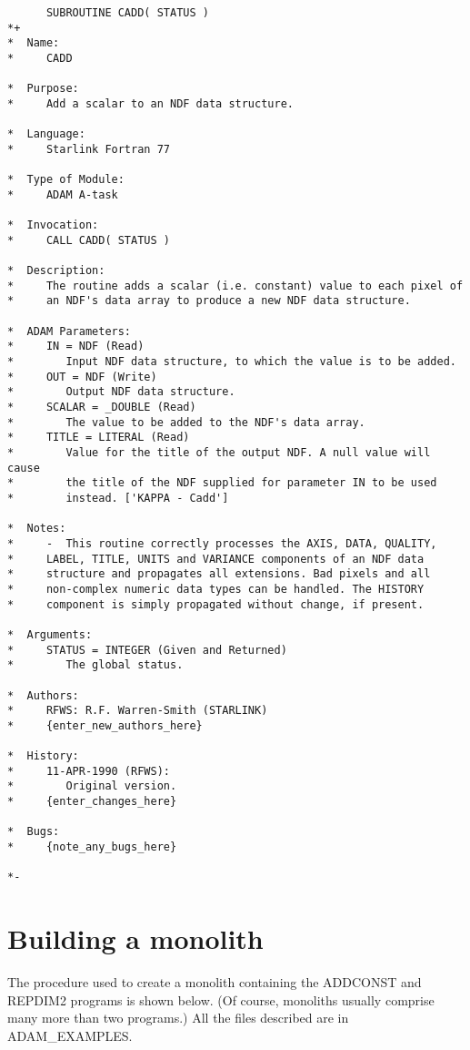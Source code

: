 \newpage
\begin{verbatim}
      SUBROUTINE CADD( STATUS )
*+
*  Name:
*     CADD

*  Purpose:
*     Add a scalar to an NDF data structure.

*  Language:
*     Starlink Fortran 77

*  Type of Module:
*     ADAM A-task

*  Invocation:
*     CALL CADD( STATUS )

*  Description:
*     The routine adds a scalar (i.e. constant) value to each pixel of
*     an NDF's data array to produce a new NDF data structure.

*  ADAM Parameters:
*     IN = NDF (Read)
*        Input NDF data structure, to which the value is to be added.
*     OUT = NDF (Write)
*        Output NDF data structure.
*     SCALAR = _DOUBLE (Read)
*        The value to be added to the NDF's data array.
*     TITLE = LITERAL (Read)
*        Value for the title of the output NDF. A null value will cause
*        the title of the NDF supplied for parameter IN to be used
*        instead. ['KAPPA - Cadd']

*  Notes:
*     -  This routine correctly processes the AXIS, DATA, QUALITY,
*     LABEL, TITLE, UNITS and VARIANCE components of an NDF data
*     structure and propagates all extensions. Bad pixels and all
*     non-complex numeric data types can be handled. The HISTORY 
*     component is simply propagated without change, if present.

*  Arguments:
*     STATUS = INTEGER (Given and Returned)
*        The global status.

*  Authors:
*     RFWS: R.F. Warren-Smith (STARLINK)
*     {enter_new_authors_here}

*  History:
*     11-APR-1990 (RFWS):
*        Original version.
*     {enter_changes_here}

*  Bugs:
*     {note_any_bugs_here}

*-
\end{verbatim}

\newpage
\section{Building a monolith\label{monolith}}

The procedure used to create a monolith containing the ADDCONST and REPDIM2 
programs is shown below.
(Of course, monoliths usually comprise many more than two programs.)
All the files described are in ADAM\_EXAMPLES.

